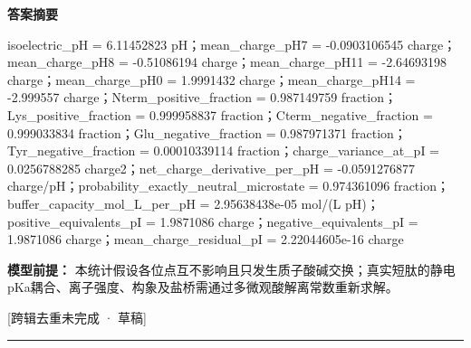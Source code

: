 \documentclass[UTF8,11pt,a4paper]{ctexart}
\begin{document}
\noindent\textbf{答案摘要}\par
isoelectric\_pH = 6.11452823 pH；mean\_charge\_pH7 = -0.0903106545 charge；mean\_charge\_pH8 = -0.51086194 charge；mean\_charge\_pH11 = -2.64693198 charge；mean\_charge\_pH0 = 1.9991432 charge；mean\_charge\_pH14 = -2.999557 charge；Nterm\_positive\_fraction = 0.987149759 fraction；Lys\_positive\_fraction = 0.999958837 fraction；Cterm\_negative\_fraction = 0.999033834 fraction；Glu\_negative\_fraction = 0.987971371 fraction；Tyr\_negative\_fraction = 0.00010339114 fraction；charge\_variance\_at\_pI = 0.0256788285 charge2；net\_charge\_derivative\_per\_pH = -0.0591276877 charge/pH；probability\_exactly\_neutral\_microstate = 0.974361096 fraction；buffer\_capacity\_mol\_L\_per\_pH = 2.95638438e-05 mol/(L pH)；positive\_equivalents\_pI = 1.9871086 charge；negative\_equivalents\_pI = 1.9871086 charge；mean\_charge\_residual\_pI = 2.22044605e-16 charge\par
\noindent\textbf{模型前提：}
本统计假设各位点互不影响且只发生质子酸碱交换；真实短肽的静电pKa耦合、离子强度、构象及盐桥需通过多微观酸解离常数重新求解。\par
\noindent\textcolor{red!65!black}{[跨辑去重未完成 · 草稿]} \par
\medskip\hrule\medskip
{}
\end{document}
